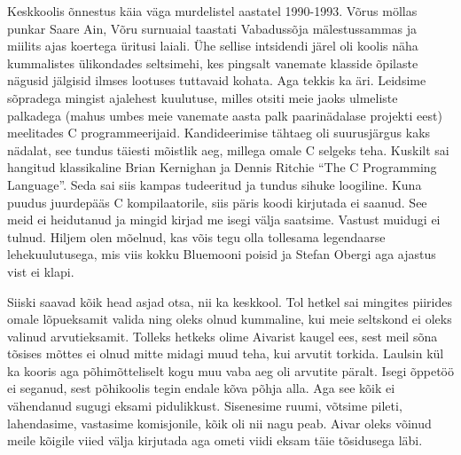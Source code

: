 Keskkoolis õnnestus käia väga murdelistel aastatel 1990-1993. Võrus möllas punkar Saare Ain, Võru surnuaial taastati Vabadussõja mälestussammas ja miilits ajas koertega üritusi laiali. Ühe sellise intsidendi järel oli koolis näha kummalistes ülikondades seltsimehi, kes pingsalt vanemate klasside õpilaste nägusid jälgisid ilmses lootuses tuttavaid kohata. Aga tekkis ka äri. Leidsime sõpradega mingist ajalehest kuulutuse, milles otsiti meie jaoks ulmeliste palkadega (mahus umbes meie vanemate aasta palk paarinädalase projekti eest) meelitades C programmeerijaid. Kandideerimise tähtaeg oli suurusjärgus kaks nädalat, see tundus täiesti mõistlik aeg, millega omale C selgeks teha. Kuskilt sai hangitud klassikaline Brian Kernighan ja Dennis Ritchie \enquote{The C Programming Language}. Seda sai siis kampas tudeeritud ja tundus sihuke loogiline. Kuna puudus juurdepääs C kompilaatorile, siis päris koodi kirjutada ei saanud. See meid ei heidutanud ja mingid kirjad me isegi välja saatsime. Vastust muidugi ei tulnud. Hiljem olen mõelnud, kas võis tegu olla tollesama legendaarse lehekuulutusega, mis viis kokku Bluemooni poisid ja Stefan Obergi aga ajastus vist ei klapi. 

Siiski saavad kõik head asjad otsa, nii ka keskkool. Tol hetkel sai mingites piirides omale lõpueksamit valida ning oleks olnud kummaline, kui meie seltskond ei oleks valinud arvutieksamit. Tolleks hetkeks olime Aivarist kaugel ees, sest meil sõna tõsises mõttes ei olnud mitte midagi muud teha, kui arvutit torkida. Laulsin kül ka kooris aga põhimõtteliselt kogu muu vaba aeg oli arvutite päralt. Isegi õppetöö ei seganud, sest põhikoolis tegin endale kõva põhja alla. Aga see kõik ei vähendanud sugugi eksami pidulikkust. Sisenesime ruumi, võtsime pileti, lahendasime, vastasime komisjonile, kõik oli nii nagu peab. Aivar oleks võinud meile kõigile viied välja kirjutada aga ometi viidi eksam täie tõsidusega läbi. 


